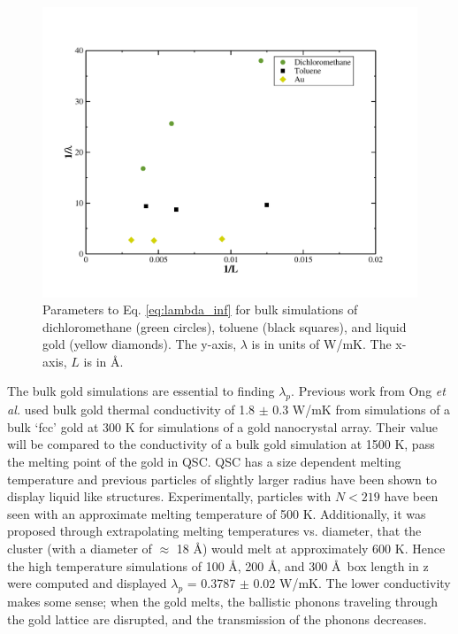 \begin{figure}[h]
    \includegraphics[scale=0.5]{figures/inverselambda-solvent.pdf}
    \caption{ Parameters to Eq. \ref{eq:lambda_inf} for bulk simulations of dichloromethane (green circles), toluene (black squares), and liquid gold (yellow diamonds). The y-axis, $\lambda$ is in units of W/mK. The x-axis, $L$ is in \AA.}
    \label{fig:inverselambda}
\end{figure}


The bulk gold simulations are essential to finding $\lambda_p$. Previous work from Ong \textit{et al.}\cite{Ong:2014yq} used bulk gold thermal conductivity of 1.8 $\pm$ 0.3 W/mK from simulations of a bulk `fcc' gold at 300 K for simulations of a gold nanocrystal array.
Their value will be compared to the conductivity of a bulk gold simulation at 1500 K, pass the melting point of the gold in QSC.
QSC has a size dependent melting temperature and previous particles of slightly larger radius have been shown to display liquid like structures.\cite{Stocker2016}
Experimentally, particles with $N<219$ have been seen with an approximate melting temperature of 500 K.\cite{Ercolessi1991}
Additionally, it was proposed through extrapolating melting temperatures vs. diameter, that the  cluster (with a diameter of $\approx$ 18 \AA) would melt at approximately 600 K.\cite{Buffat1976}
Hence the high temperature simulations of 100 \AA, 200 \AA, and 300 \AA\ box length in z were computed and displayed $\lambda_p$ = 0.3787 $\pm$ 0.02 W/mK.
The lower conductivity makes some sense; when the gold melts, the ballistic phonons traveling through the gold lattice are disrupted, and the transmission of the phonons decreases.

